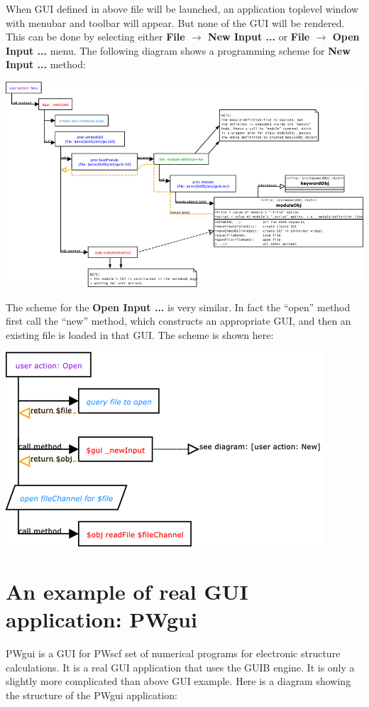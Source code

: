 \documentclass[12pt]{article}
\def\key#1{{\bf #1}}
\begin{document}
When GUI defined in above file will be launched, an application
toplevel window with menubar and toolbar will appear. But none of the
GUI will be rendered. This can be done by selecting either \key{File
  $\rightarrow$ New Input ...} or \key{File $\rightarrow$ Open Input
  ...} menu. The following diagram shows a programming scheme for
\key{New Input ...} method:

\includegraphics[width=1.0\textwidth]{diagrams/GUI-new.png}

The scheme for the \key{Open Input ...} is very similar. In fact the
``open'' method first call the ``new'' method, which constructs an
appropriate GUI, and then an existing file is loaded in that GUI. The
scheme is shown here:

\includegraphics[width=.5\textwidth]{diagrams/GUI-open.png}

\section{An example of real GUI application: PWgui}

PWgui is a GUI for PWscf set of numerical programs for electronic
structure calculations. It is a real GUI application that uses the
GUIB engine. It is only a slightly more complicated than above GUI
example.  Here is a diagram showing the structure of the PWgui
application:
\end{document}
